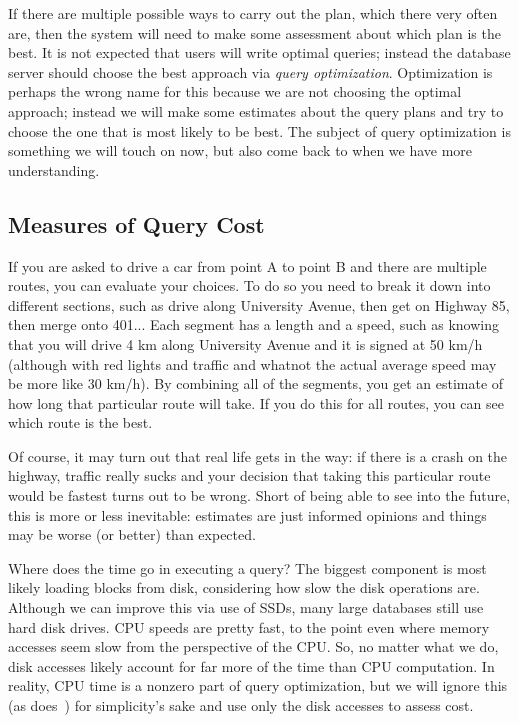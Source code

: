 \documentclass[a4paper]{report}
\begin{document}
If there are multiple possible ways to carry out the plan, which there very often are, then the system will need to make some assessment about which plan is the best. It is not expected that users will write optimal queries; instead the database server should choose the best approach via \textit{query optimization}. Optimization is perhaps the wrong name for this because we are not choosing the optimal approach; instead we will make some estimates about the query plans and try to choose the one that is most likely to be best. The subject of query optimization is something we will touch on now, but also come back to when we have more understanding.

\subsection*{Measures of Query Cost}

If you are asked to drive a car from point A to point B and there are multiple routes, you can evaluate your choices. To do so you need to break it down into different sections, such as drive along University Avenue, then get on Highway 85, then merge onto 401... Each segment has a length and a speed, such as knowing that you will drive 4 km along University Avenue and it is signed at 50 km/h (although with red lights and traffic and whatnot the actual average speed may be more like 30 km/h). By combining all of the segments, you get an estimate of how long that particular route will take. If you do this for all routes, you can see which route is the best. 

Of course, it may turn out that real life gets in the way: if there is a crash on the highway, traffic really sucks and your decision that taking this particular route would be fastest turns out to be wrong. Short of being able to see into the future, this is more or less inevitable: estimates are just informed opinions and things may be worse (or better) than expected. 

Where does the time go in executing a query? The biggest component is most likely loading blocks from disk, considering how slow the disk operations are. Although we can improve this via use of SSDs, many large databases still use hard disk drives. CPU speeds are pretty fast, to the point even where memory accesses seem slow from the perspective of the CPU. So, no matter what we do, disk accesses likely account for far more of the time than CPU computation. In reality, CPU time is a nonzero part of query optimization, but we will ignore this (as does~\cite{dsc}) for simplicity's sake and use only the disk accesses to assess cost.
\end{document}

